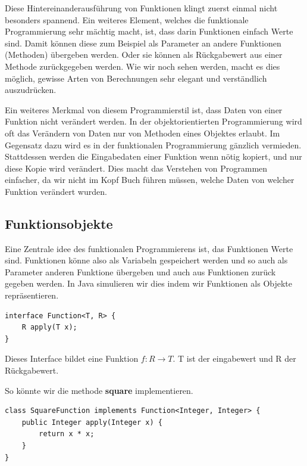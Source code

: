 \documentclass[12pt]{article}
\begin{document}
    Diese Hintereinanderausführung von Funktionen klingt zuerst einmal nicht besonders spannend. 
    Ein weiteres Element, welches die funktionale Programmierung sehr mächtig macht, ist, dass darin Funktionen einfach Werte sind. 
    Damit können diese zum Beispiel als Parameter an andere Funktionen (Methoden) übergeben werden. Oder sie können als Rückgabewert aus einer Methode zurückgegeben werden. 
    Wie wir noch sehen werden, macht es dies möglich, gewisse Arten von Berechnungen sehr elegant und verständlich auszudrücken.

    Ein weiteres Merkmal von diesem Programmierstil ist, dass Daten von einer Funktion nicht verändert werden. 
    In der objektorientierten Programmierung wird oft das Verändern von Daten nur von Methoden eines Objektes erlaubt. 
    Im Gegensatz dazu wird es in der funktionalen Programmierung gänzlich vermieden. Stattdessen werden die Eingabedaten einer Funktion wenn nötig kopiert, und nur diese Kopie wird verändert. 
    Dies macht das Verstehen von Programmen einfacher, da wir nicht im Kopf Buch führen müssen, welche Daten von welcher Funktion verändert wurden.

    \subsection*{Funktionsobjekte}

    Eine Zentrale idee des funktionalen Programmierens ist, das Funktionen Werte sind. Funktionen könne also 
    als Variabeln gespeichert werden und so auch als Parameter anderen Funktione übergeben und auch aus Funktionen 
    zurück gegeben werden. 
    In Java simulieren wir dies indem wir Funktionen als Objekte repräsentieren. 

    \begin{lstlisting}[caption=funktion]
interface Function<T, R> {
    R apply(T x);
}
    \end{lstlisting}

    Dieses Interface bildet eine Funktion $f: R \rightarrow T$. T ist der eingabewert und R der Rückgabewert. 

    So könnte wir die methode \textbf{square} implementieren. 

    \begin{lstlisting}[caption=square als Funktion]
class SquareFunction implements Function<Integer, Integer> {
    public Integer apply(Integer x) {
        return x * x;
    }
}
    \end{lstlisting}
    
\end{document}
